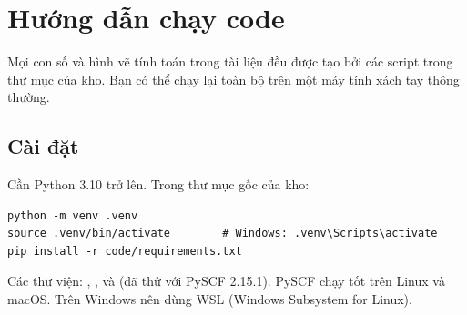 \chapter{Hướng dẫn chạy code}
\label{pl:code}

Mọi con số và hình vẽ tính toán trong tài liệu đều được tạo bởi các script trong thư mục  của kho. Bạn có thể chạy lại toàn bộ trên một máy tính xách tay thông thường.

\section*{Cài đặt}
Cần Python 3.10 trở lên. Trong thư mục gốc của kho:
\begin{verbatim}
python -m venv .venv
source .venv/bin/activate        # Windows: .venv\Scripts\activate
pip install -r code/requirements.txt
\end{verbatim}
Các thư viện: , ,  và  (đã thử với PySCF 2.15.1). PySCF chạy tốt trên Linux và macOS. Trên Windows nên dùng WSL (Windows Subsystem for Linux).


